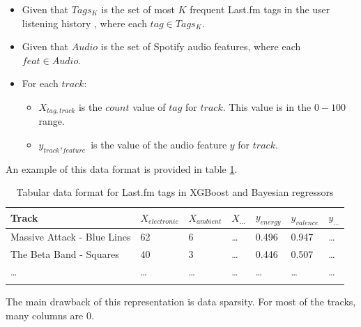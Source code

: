 \documentclass[sn-mathphys]{sn-jnl}%
\theoremstyle{thmstyleone}%
\theoremstyle{thmstyletwo}%
\theoremstyle{thmstylethree}%
\begin{document}
\begin{itemize}
      \item Given that $Tags_{K}$ is the set of most $K$ frequent Last.fm tags in the user listening history
            , where each $tag \in Tags_{K}$.
      \item Given that $Audio$ is the set of Spotify audio features, where each $feat \in Audio$.
      \item For each $track$:
      \begin{itemize}
            \item $X_{tag,track}$ is the $count$ value of $tag$ for $track$. This value is in the $0-100$ range.
            \item $y_{track},_{feature}$ is the value of the audio feature $y$ for $track$.
      \end{itemize}
\end{itemize}

An example of this data format is provided in table \ref{tabular_tags_format}.

\begin{table}[h]
      \begin{center}
      \begin{minipage}{\textwidth}
      \caption{Tabular data format for Last.fm tags in XGBoost and Bayesian regressors}\label{tabular_tags_format}%
      \begin{tabular}{@{}lllllll@{}}
      \toprule
      Track                         & $X_{electronic}$ & $X_{ambient}$ & $X_{\dots}$ & $y_{energy}$ & $y_{valence}$ & $y_{\dots}$ \\
      \midrule
      Massive Attack - Blue Lines   & 62               & 6             &  \dots      & 0.496        & 0.947         & \dots  \\
      The Beta Band - Squares       & 40               & 3             &  \dots      & 0.446        & 0.507         & \dots  \\
      \dots                         & \dots            & \dots         &  \dots      & \dots        & \dots         & \dots  \\
      \botrule
      \end{tabular}
      \end{minipage}
      \end{center}
\end{table}

The main drawback of this representation is data sparsity.
For most of the tracks, many columns are \num{0}.
\end{document}
